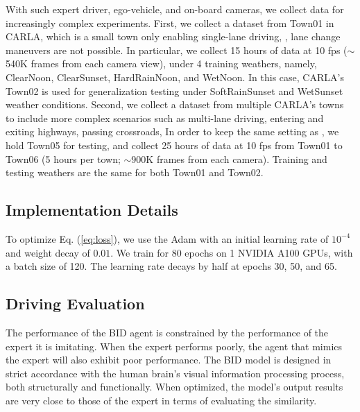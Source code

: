 With such expert driver, ego-vehicle, and on-board cameras, we collect data for increasingly complex experiments. 
First, we collect a dataset from Town01 in CARLA, which is a small town only enabling single-lane driving, {\ie}, lane change maneuvers are not possible. 
In particular, we collect 15 hours of data at 10 fps ($\sim$540K frames from each camera view), under 4 training weathers, namely, ClearNoon, ClearSunset, HardRainNoon, and WetNoon. 
In this case, CARLA's Town02 is used for generalization testing under SoftRainSunset and WetSunset weather conditions. 
Second, we collect a dataset from multiple CARLA's towns to include more complex scenarios such as multi-lane driving, entering and exiting highways, passing crossroads, {\etc} In order to keep the same setting as \cite{Hu:2022}, we hold Town05 for testing, and collect 25 hours of data at 10 fps from Town01 to Town06 (5 hours per town; $\sim$900K frames from each camera). 
Training and testing weathers are the same for both Town01 and Town02. 



\subsection{Implementation Details}
To optimize Eq. (\ref{eq:loss}), we use the Adam \cite{Kingma:2015} with an initial learning rate of $10^{-4}$ and weight decay of $0.01$. 
We train for 80 epochs on 1 NVIDIA A100 GPUs, with a batch size of 120. 
The learning rate decays by half at epochs 30, 50, and 65. 



\subsection{Driving Evaluation}
\label{sec:Metrics}
The performance of the BID agent is constrained by the performance of the expert it is imitating. 
When the expert performs poorly, the agent that mimics the expert will also exhibit poor performance. 
The BID model is designed in strict accordance with the human brain's visual information processing process, both structurally and functionally. 
When optimized, the model's output results are very close to those of the expert in terms of evaluating the similarity.


